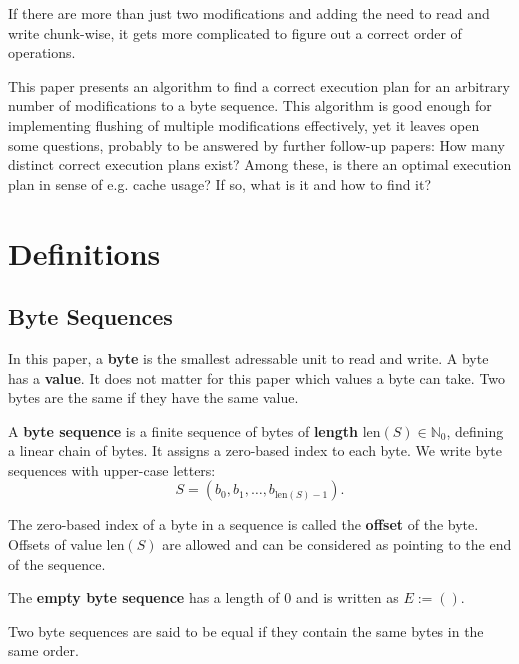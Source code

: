 \documentclass[english, 10pt, openright, twocolumn, landscape, twoside, notitlepage, a4paper, pdftex]		
{article}
\begin{document}
If there are more than just two modifications and adding the need to read and write chunk-wise, it gets more complicated to figure out a correct order of operations.

This paper presents an algorithm to find a correct execution plan for an arbitrary number of modifications to a byte sequence. This algorithm is good enough for implementing flushing of multiple modifications effectively, yet it leaves open some questions, probably to be answered by further follow-up papers: How many distinct correct execution plans exist? Among these, is there an optimal execution plan in sense of e.g. cache usage? If so, what is it and how to find it?

\section{Definitions}%
\label{sec:Definitions}%

\subsection{Byte Sequences}%
\label{sec:ByteSequences}%

In this paper, a \textbf{byte} is the smallest adressable unit to read and write. A byte has a \textbf{value}. It does not matter for this paper which values a byte can take. Two bytes are the same if they have the same value.

A \textbf{byte sequence} is a finite sequence of bytes of \textbf{length} $\text{len}(S)\in\mathbb{N}_{0}$, defining a linear chain of bytes. It assigns a zero-based index to each byte. We write byte sequences with upper-case letters:
\[S=(b_{0}, b_{1}, \ldots, b_{\text{len}(S)-1}).\]

The zero-based index of a byte in a sequence is called the \textbf{offset} of the byte. Offsets of value $\text{len}(S)$ are allowed and can be considered as pointing to the end of the sequence.

The \textbf{empty byte sequence} has a length of 0 and is written as $E:=()$.

Two byte sequences are said to be equal if they contain the same bytes in the same order.
\end{document}
